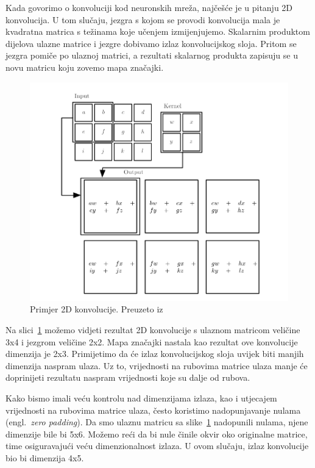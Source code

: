 \documentclass[times, utf8, zavrsni, numeric]{fer}
\begin{document}
Kada govorimo o konvoluciji kod neuronskih mreža, najčešće je u pitanju 2D konvolucija. 
U tom slučaju, jezgra s kojom se provodi konvolucija mala je kvadratna matrica s težinama koje učenjem izmijenjujemo. Skalarnim produktom dijelova ulazne matrice i jezgre dobivamo izlaz konvolucijskog sloja.
Pritom se jezgra pomiče po ulaznoj matrici, a rezultati skalarnog produkta zapisuju se u novu matricu koju zovemo mapa značajki.

\pagebreak
\begin{figure}[htb]
    \centering
    \includegraphics[scale=0.5]{convolution.png}
    \caption{Primjer 2D konvolucije. Preuzeto iz \cite{Goodfellow-et-al-2016}}
    \label{fig:convolution}
\end{figure}

Na slici~\ref{fig:convolution} možemo vidjeti rezultat 2D konvolucije s ulaznom matricom veličine 3x4 i jezgrom veličine 2x2. 
Mapa značajki nastala kao rezultat ove konvolucije dimenzija je 2x3. Primijetimo da će izlaz konvolucijskog sloja uvijek biti manjih dimenzija naspram ulaza.
Uz to, vrijednosti na rubovima matrice ulaza manje će doprinijeti rezultatu naspram vrijednosti koje su dalje od rubova.

Kako bismo imali veću kontrolu nad dimenzijama izlaza, kao i utjecajem vrijednosti na rubovima matrice ulaza, često koristimo nadopunjavanje nulama (engl.\ \textit{zero padding}).
Da smo ulaznu matricu sa slike~\ref{fig:convolution} nadopunili nulama, njene dimenzije bile bi 5x6. 
Možemo reći da bi nule činile okvir oko originalne matrice, time osiguravajući veću dimenzionalnost izlaza. U ovom slučaju, izlaz konvolucije bio bi dimenzija 4x5.
\end{document}
